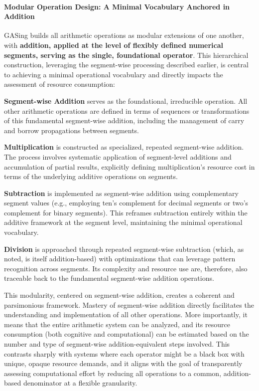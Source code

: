 \paragraph{Modular Operation Design: A Minimal Vocabulary Anchored in Addition}

GASing builds all arithmetic operations as modular extensions of one another, with \textbf{addition, applied at the level of flexibly defined numerical segments, serving as the single, foundational operator}. This hierarchical construction, leveraging the segment-wise processing described earlier, is central to achieving a minimal operational vocabulary and directly impacts the assessment of resource consumption:


\noindent \textbf{Segment-wise Addition} serves as the foundational, irreducible operation. All other arithmetic operations are defined in terms of sequences or transformations of this fundamental segment-wise addition, including the management of carry and borrow propagations between segments.


\noindent \textbf{Multiplication} is constructed as specialized, repeated segment-wise addition. The process involves systematic application of segment-level additions and accumulation of partial results, explicitly defining multiplication's resource cost in terms of the underlying additive operations on segments.


\noindent \textbf{Subtraction} is implemented as segment-wise addition using complementary segment values (e.g., employing ten's complement for decimal segments or two's complement for binary segments). This reframes subtraction entirely within the additive framework at the segment level, maintaining the minimal operational vocabulary.


\noindent \textbf{Division} is approached through repeated segment-wise subtraction (which, as noted, is itself addition-based) with optimizations that can leverage pattern recognition across segments. Its complexity and resource use are, therefore, also traceable back to the fundamental segment-wise addition operations.


This modularity, centered on segment-wise addition, creates a coherent and parsimonious framework. Mastery of segment-wise addition directly facilitates the understanding and implementation of all other operations. More importantly, it means that the entire arithmetic system can be analyzed, and its resource consumption (both cognitive and computational) can be estimated based on the number and type of segment-wise addition-equivalent steps involved. This contrasts sharply with systems where each operator might be a black box with unique, opaque resource demands, and it aligns with the goal of transparently assessing computational effort by reducing all operations to a common, addition-based denominator at a flexible granularity.
